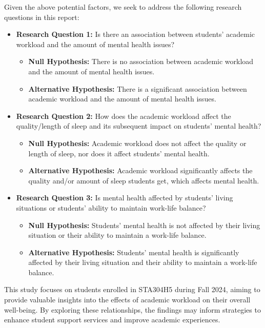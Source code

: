 \documentclass[
  letterpaper,
  DIV=11,
  numbers=noendperiod]{scrartcl}
\begin{document}
Given the above potential factors, we seek to address the following
research questions in this report:

\begin{itemize}
\item
  \textbf{Research Question 1:} Is there an association between
  students' academic workload and the amount of mental health issues?

  \begin{itemize}
  \item
    \textbf{Null Hypothesis:} There is no association between academic
    workload and the amount of mental health issues.
  \item
    \textbf{Alternative Hypothesis:} There is a significant association
    between academic workload and the amount of mental health issues.
  \end{itemize}
\item
  \textbf{Research Question 2:} How does the academic workload affect
  the quality/length of sleep and its subsequent impact on students'
  mental health?

  \begin{itemize}
  \item
    \textbf{Null Hypothesis:} Academic workload does not affect the
    quality or length of sleep, nor does it affect students' mental
    health.
  \item
    \textbf{Alternative Hypothesis:} Academic workload significantly
    affects the quality and/or amount of sleep students get, which
    affects mental health.
  \end{itemize}
\item
  \textbf{Research Question 3:} Is mental health affected by students'
  living situations or students' ability to maintain work-life balance?

  \begin{itemize}
  \item
    \textbf{Null Hypothesis:} Students' mental health is not affected by
    their living situation or their ability to maintain a work-life
    balance.
  \item
    \textbf{Alternative Hypothesis:} Students' mental health is
    significantly affected by their living situation and their ability
    to maintain a work-life balance.
  \end{itemize}
\end{itemize}

This study focuses on students enrolled in STA304H5 during Fall 2024,
aiming to provide valuable insights into the effects of academic
workload on their overall well-being. By exploring these relationships,
the findings may inform strategies to enhance student support services
and improve academic experiences.
\end{document}
